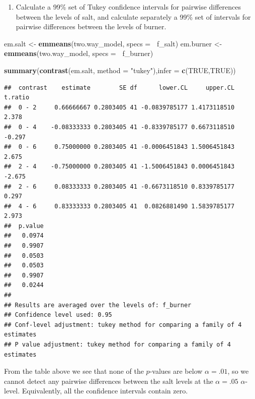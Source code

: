 \documentclass[12pt,]{article}
\newenvironment{Shaded}{\begin{snugshade}}{\end{snugshade}}
\newcommand{\KeywordTok}[1]{\textcolor[rgb]{0.13,0.29,0.53}{\textbf{#1}}}
\newcommand{\DataTypeTok}[1]{\textcolor[rgb]{0.13,0.29,0.53}{#1}}
\newcommand{\StringTok}[1]{\textcolor[rgb]{0.31,0.60,0.02}{#1}}
\newcommand{\OtherTok}[1]{\textcolor[rgb]{0.56,0.35,0.01}{#1}}
\newcommand{\OperatorTok}[1]{\textcolor[rgb]{0.81,0.36,0.00}{\textbf{#1}}}
\newcommand{\NormalTok}[1]{#1}
\providecommand{\tightlist}{%
  \setlength{\itemsep}{0pt}\setlength{\parskip}{0pt}}
\begin{document}
\begin{enumerate}
\def\labelenumi{(\alph{enumi})}
\setcounter{enumi}{1}
\tightlist
\item
  Calculate a 99\% set of Tukey confidence intervals for pairwise
  differences between the levels of salt, and calculate separately a
  99\% set of intervals for pairwise differences between the levels of
  burner.
\end{enumerate}

\begin{Shaded}
\begin{Highlighting}[]
\NormalTok{em.salt <-}\StringTok{ }\KeywordTok{emmeans}\NormalTok{(two.way_model, }\DataTypeTok{specs =} \OperatorTok{~}\NormalTok{f_salt)}
\NormalTok{em.burner <-}\StringTok{ }\KeywordTok{emmeans}\NormalTok{(two.way_model, }\DataTypeTok{specs =} \OperatorTok{~}\NormalTok{f_burner)}

\KeywordTok{summary}\NormalTok{(}\KeywordTok{contrast}\NormalTok{(em.salt, }\DataTypeTok{method =} \StringTok{"tukey"}\NormalTok{),}\DataTypeTok{infer =} \KeywordTok{c}\NormalTok{(}\OtherTok{TRUE}\NormalTok{,}\OtherTok{TRUE}\NormalTok{))}
\end{Highlighting}
\end{Shaded}

\begin{verbatim}
##  contrast    estimate        SE df      lower.CL     upper.CL t.ratio
##  0 - 2     0.66666667 0.2803405 41 -0.0839785177 1.4173118510   2.378
##  0 - 4    -0.08333333 0.2803405 41 -0.8339785177 0.6673118510  -0.297
##  0 - 6     0.75000000 0.2803405 41 -0.0006451843 1.5006451843   2.675
##  2 - 4    -0.75000000 0.2803405 41 -1.5006451843 0.0006451843  -2.675
##  2 - 6     0.08333333 0.2803405 41 -0.6673118510 0.8339785177   0.297
##  4 - 6     0.83333333 0.2803405 41  0.0826881490 1.5839785177   2.973
##  p.value
##   0.0974
##   0.9907
##   0.0503
##   0.0503
##   0.9907
##   0.0244
## 
## Results are averaged over the levels of: f_burner 
## Confidence level used: 0.95 
## Conf-level adjustment: tukey method for comparing a family of 4 estimates 
## P value adjustment: tukey method for comparing a family of 4 estimates
\end{verbatim}

From the table above we see that none of the \(p\)-values are below
\(\alpha = .01\), so we cannot detect any pairwise differences between
the salt levels at the \(\alpha=.05\) \(\alpha\)-level. Equivalently,
all the confidence intervals contain zero.
\end{document}
